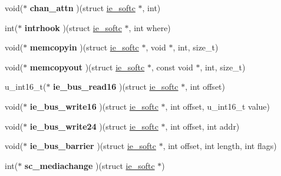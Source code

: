 \begin{DoxyCompactItemize}
void($\ast$ {\bfseries chan\+\_\+attn} )(struct \mbox{\hyperlink{structie__softc}{ie\+\_\+softc}} $\ast$, int)
\item 
\mbox{\label{structie__softc_aeb272ee2fcfd31384d87370cf60d79a4}} 
int($\ast$ {\bfseries intrhook} )(struct \mbox{\hyperlink{structie__softc}{ie\+\_\+softc}} $\ast$, int where)
\item 
\mbox{\label{structie__softc_a6c544d8c81fe22bd5554a75b51eeb070}} 
void($\ast$ {\bfseries memcopyin} )(struct \mbox{\hyperlink{structie__softc}{ie\+\_\+softc}} $\ast$, void $\ast$, int, size\+\_\+t)
\item 
\mbox{\label{structie__softc_aea4533a28033374e7c4f303a14b43d93}} 
void($\ast$ {\bfseries memcopyout} )(struct \mbox{\hyperlink{structie__softc}{ie\+\_\+softc}} $\ast$, const void $\ast$, int, size\+\_\+t)
\item 
\mbox{\label{structie__softc_ad6421ffd8c026a2b1ae7ea056450d549}} 
u\+\_\+int16\+\_\+t($\ast$ {\bfseries ie\+\_\+bus\+\_\+read16} )(struct \mbox{\hyperlink{structie__softc}{ie\+\_\+softc}} $\ast$, int offset)
\item 
\mbox{\label{structie__softc_a6372b3c1a46f033118133f8a13a28a29}} 
void($\ast$ {\bfseries ie\+\_\+bus\+\_\+write16} )(struct \mbox{\hyperlink{structie__softc}{ie\+\_\+softc}} $\ast$, int offset, u\+\_\+int16\+\_\+t value)
\item 
\mbox{\label{structie__softc_a5cdf18b527db6df1171c1b1772e04356}} 
void($\ast$ {\bfseries ie\+\_\+bus\+\_\+write24} )(struct \mbox{\hyperlink{structie__softc}{ie\+\_\+softc}} $\ast$, int offset, int addr)
\item 
\mbox{\label{structie__softc_aea3c71399f786c0c2e7134e74137400f}} 
void($\ast$ {\bfseries ie\+\_\+bus\+\_\+barrier} )(struct \mbox{\hyperlink{structie__softc}{ie\+\_\+softc}} $\ast$, int offset, int length, int flags)
\item 
\mbox{\label{structie__softc_a5e1b1ab00f7e66ce37fe30f5f95be426}} 
int($\ast$ {\bfseries sc\+\_\+mediachange} )(struct \mbox{\hyperlink{structie__softc}{ie\+\_\+softc}} $\ast$)
\item 

\end{DoxyCompactItemize}

